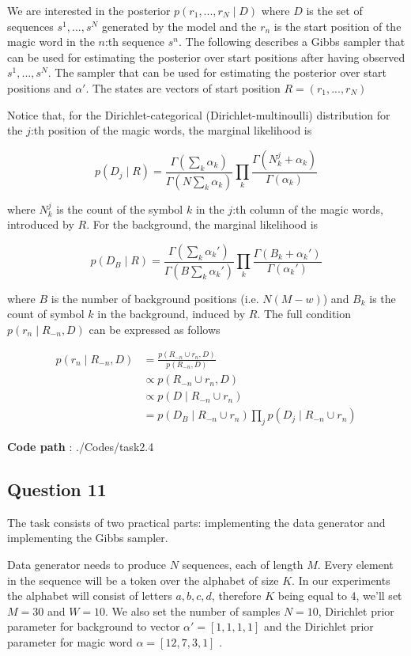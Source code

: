 \documentclass[]{article}
\begin{document}
	We are interested in the posterior $p(r_1,...,r_N \mid D)$ where $D$ is the set of sequences $ s^1, ..., s^N$ generated by the model and the $r_n$ is the start position of the magic word in the $n$:th sequence $s^n$. The following describes a Gibbs sampler that can be used for estimating the posterior over start positions after having observed $s^1, ..., s^N$. The sampler that can be used for estimating the posterior over start positions and $\alpha'$. The states are vectors of start position $R= (r_1,...,r_N)$
	
	Notice that, for the Dirichlet-categorical (Dirichlet-multinoulli) distribution for the $j$:th position of the magic words, the marginal likelihood is 
	
	$$ p(D_j \mid R) = \frac{\Gamma(\sum_k \alpha_k)}{\Gamma(N \sum_k \alpha_k)} \prod_k \frac{\Gamma( N_k^j + \alpha_k)}{\Gamma(\alpha_k)} $$
	
	where $N_k^j$ is the count of the symbol $k$ in the $j$:th column of the magic words, introduced by $R$. For the background, the marginal likelihood is 
	
	$$ p(D_B \mid R) = \frac{\Gamma(\sum_k \alpha_k')}{\Gamma(B \sum_k \alpha_k')} \prod_k \frac{\Gamma( B_k + \alpha_k')}{\Gamma(\alpha_k')} $$
	
	where $B$ is the number of background positions (i.e. $N(M-w)$) and $B_k$ is the count of symbol $k$ in the background, induced by $R$. The full condition $p(r_n \mid R_{-n}, D)$ can be expressed as follows
	
	\begin{align*}
	p(r_n \mid R_{-n}, D) &= \frac{p(R_{-n} \cup r_n, D)}{p(R_{-n}, D)} \\
	& \propto p(R_{-n} \cup r_n, D) \\
	& \propto p(D \mid R_{-n} \cup r_n) \\
	& = p(D_B \mid R_{-n} \cup r_n) \prod_j p(D_j \mid R_{-n} \cup r_n)
	\end{align*}
	
	\textbf{Code path} : ./Codes/task2.4  
	
	\subsection*{Question 11}
	
	The task consists of two practical parts: implementing the data generator and implementing the Gibbs sampler. 
	
	Data generator needs to produce $N$ sequences, each of length $M$. Every element in the sequence will be a token over the alphabet of size $K$. In our experiments the alphabet will consist of letters $a,b,c,d$, therefore $K$ being equal to $4$, we'll set $M=30$ and $W=10$. We also set the number of samples $N=10$, Dirichlet prior parameter for background  to vector $\alpha' = [1,1,1,1]$ and the Dirichlet prior parameter for magic word  $\alpha = [12,7,3,1]$ .
	
\end{document}
